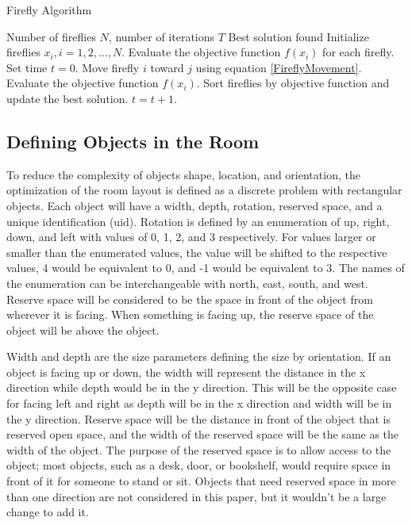 \documentclass[conference]{IEEEtran}
\begin{document}
    \begin{algorithm}
    \caption{Firefly Algorithm}
    \label{FireflyAlgorithm}
    \begin{algorithmic}
        \renewcommand{\algorithmicrequire}{\textbf{Input:}}
        \renewcommand{\algorithmicensure}{\textbf{Output:}}
        \REQUIRE Number of fireflies $N$, number of iterations $T$
        \ENSURE Best solution found
        \STATE Initialize fireflies $x_i, i = 1, 2, ..., N$.
        \STATE Evaluate the objective function $f(x_i)$ for each firefly.
        \STATE Set time $t = 0$.
                        \STATE Move firefly $i$ toward $j$ using equation \ref{FireflyMovement}.
                        \STATE Evaluate the objective function $f(x_i)$.
                    \ENDIF
                \ENDFOR
            \ENDFOR
            \STATE Sort fireflies by objective function and update the best solution.
            \STATE $t = t + 1$.
        \ENDWHILE
        \end{algorithmic}
    \end{algorithm}

    \subsection{Defining Objects in the Room}
    To reduce the complexity of objects shape, location, and orientation, the optimization of the room layout is defined as a discrete problem with rectangular objects. Each object will have a width, depth, rotation, reserved space, and a unique identification (uid). Rotation is defined by an enumeration of up, right, down, and left with values of 0, 1, 2, and 3 respectively. For values larger or smaller than the enumerated values, the value will be shifted to the respective values, 4 would be equivalent to 0, and -1 would be equivalent to 3. The names of the enumeration can be interchangeable with north, east, south, and west. Reserve space will be considered to be the space in front of the object from wherever it is facing. When something is facing up, the reserve space of the object will be above the object.
    
    Width and depth are the size parameters defining the size by orientation. If an object is facing up or down, the width will represent the distance in the x direction while depth would be in the y direction. This will be the opposite case for facing left and right as depth will be in the x direction and width will be in the y direction. Reserve space will be the distance in front of the object that is reserved open space, and the width of the reserved space will be the same as the width of the object. The purpose of the reserved space is to allow access to the object; most objects, such as a desk, door, or bookshelf, would require space in front of it for someone to stand or sit. Objects that need reserved space in more than one direction are not considered in this paper, but it wouldn’t be a large change to add it.
    
\end{document}

